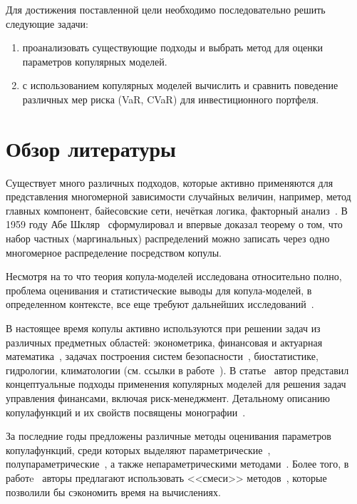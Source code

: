 Для достижения поставленной цели необходимо последовательно решить следующие задачи:
\begin{enumerate}[label=\arabic*)]
    \item проанализовать существующие подходы и выбрать метод для оценки параметров копулярных моделей. 
    \item с использованием копулярных моделей вычислить и сравнить поведение различных мер риска (VaR, CVaR) для инвестиционного портфеля.
\end{enumerate}


\section{Обзор литературы}
\label{section:literature}

Существует много различных подходов, которые активно применяются для представления многомерной зависимости случайных величин, например, метод главных компонент, байесовские сети, нечёткая логика, факторный анализ~\cite{Huynh2014, Kole2007}. 
В 1959 году Абе Шкляр~\cite{Sklar1959} сформулировал и впервые доказал теорему о том, что набор частных (маргинальных) распределений можно записать через одно многомерное распределение посредством копулы.

Несмотря на то что теория копула-моделей исследована относительно полно, проблема оценивания и статистические выводы для копула-моделей, в определенном контексте, все
еще требуют дальнейших исследований~\cite{Fantazzini2011}.

В настоящее время копулы активно используются при решении задач из различных предметных областей: эконометрика, финансовая и актуарная математика~\cite{Antonov2016,Atskanov2016,Knyazev2016,  Penikas2014, Travkin2013,  Penikas2010,  Shemyakin2017}, задачах построения систем безопасности~\cite{Sundaresan2011}, биостатистике, гидрологии, климатологии (см. ссылки в работе~\cite{Fantazzini2011}). В статье~\cite{Penikas2010} автор представил концептуальные подходы применения копулярных моделей для решения задач управления финансами, включая риск-менеджмент.
Детальному описанию копула\-функций и их свойств посвящены монографии~\cite{Joe2014, Nelsen1999}.

За последние годы предложены различные методы оценивания параметров копула\-функций, среди которых выделяют параметрические~\cite{Patton2006}, полупараметрические~\cite{Chen2006, Lourme2016}, а также непараметрическими методами~\cite{Fermanian2003, Kim2007}. 
Более того, в работe~\cite{Cherubini2004} авторы предлагают использовать <<смеси>> методов~\cite{Fantazzini2011}, которые позволили бы сэкономить время на вычислениях.

